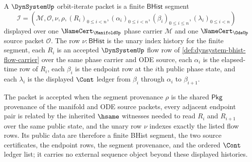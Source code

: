 \begin{definition}
\label{def:dynsystem-orbit-iterate-packet}
A $\DynSystemUp$ orbit-iterate packet is a finite $\mathsf{BHist}$ segment
$$
\mathcal{I}=(\mathcal{M},\mathcal{O},\nu,\rho,(R_i)_{0 \leq i < n},(\alpha_i)_{0 \leq i < n},(\beta_i)_{0 \leq i \leq n},(\lambda_i)_{0 \leq i < n})
$$
displayed over one $\NameCert_{\ManifoldUp}$ phase carrier $\mathcal{M}$ and one $\NameCert_{\OdeUp}$ source packet $\mathcal{O}$. The row $\nu:\mathsf{BHist}$ is the unary index history for the finite segment, each $R_i$ is an accepted $\DynSystemUp$ flow row of \autoref{def:dynsystem-bhist-flow-carrier} over the same phase carrier and ODE source, each $\alpha_i$ is the elapsed-time row of $R_i$, each $\beta_i$ is the endpoint row at the $i$th public phase state, and each $\lambda_i$ is the displayed $\Cont$ ledger from $\beta_i$ through $\alpha_i$ to $\beta_{i+1}$.

The packet is accepted when the segment provenance $\rho$ is the shared $\mathsf{Pkg}$ provenance of the manifold and ODE source packets, every adjacent endpoint pair is related by the inherited $\hsame$ witnesses needed to read $R_i$ and $R_{i+1}$ over the same public state, and the unary row $\nu$ indexes exactly the listed flow rows. Its public data are therefore a finite BHist segment, the two source certificates, the endpoint rows, the segment provenance, and the ordered $\Cont$ ledger list; it carries no external sequence object beyond these displayed histories.
\end{definition}

